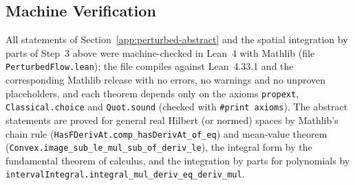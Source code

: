 \subsection{Machine Verification}\label{app:perturbed-lean}

All statements of Section~\ref{app:perturbed-abstract} and the spatial integration by parts of Step~3 above were machine-checked in Lean~4 with Mathlib (file \texttt{PerturbedFlow.lean}); the file compiles against Lean~4.33.1 and the corresponding Mathlib release with no errors, no warnings and no unproven placeholders, and each theorem depends only on the axioms \texttt{propext}, \texttt{Classical.choice} and \texttt{Quot.sound} (checked with \texttt{\#print axioms}).
The abstract statements are proved for general real Hilbert (or normed) spaces by Mathlib's chain rule (\texttt{HasFDerivAt.comp\_hasDerivAt\_of\_eq}) and mean-value theorem (\texttt{Convex.image\_sub\_le\_mul\_sub\_of\_deriv\_le}), the integral form by the fundamental theorem of calculus, and the integration by parts for polynomials by \texttt{intervalIntegral.}\allowbreak\texttt{integral\_mul\_deriv\_eq\_deriv\_mul}.

